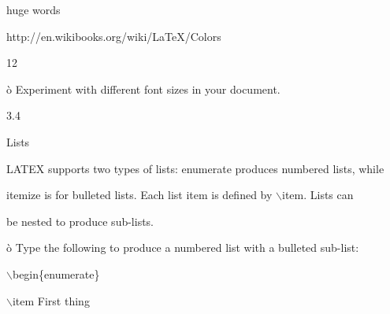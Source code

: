 \documentclass[a4paper,portrait,12pt]{article}
\begin{document}
\begin{flushleft}
huge words
\end{flushleft}





\begin{flushleft}
http://en.wikibooks.org/wiki/LaTeX/Colors
\end{flushleft}





12





\begin{flushleft}
\newpage
\`{o} Experiment with different font sizes in your document.
\end{flushleft}





3.4





\begin{flushleft}
Lists
\end{flushleft}





\begin{flushleft}
LATEX supports two types of lists: enumerate produces numbered lists, while
\end{flushleft}


\begin{flushleft}
itemize is for bulleted lists. Each list item is defined by \ensuremath{\backslash}item. Lists can
\end{flushleft}


\begin{flushleft}
be nested to produce sub-lists.
\end{flushleft}


\begin{flushleft}
\`{o} Type the following to produce a numbered list with a bulleted sub-list:
\end{flushleft}


\begin{flushleft}
\ensuremath{\backslash}begin\{enumerate\}
\end{flushleft}


\begin{flushleft}
\ensuremath{\backslash}item First thing
\end{flushleft}
\end{document}
